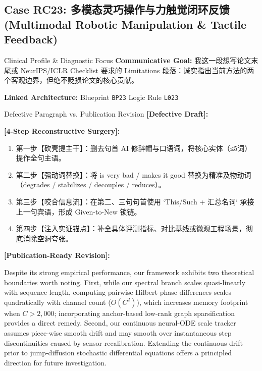 \subsection{Case RC23: 多模态灵巧操作与力触觉闭环反馈 (Multimodal Robotic Manipulation \& Tactile Feedback)}\label{case:RC23}
\begin{ConceptBox}{Clinical Profile \& Diagnostic Focus}
\textbf{Communicative Goal:} 我这一段想写论文末尾或 NeurIPS/ICLR Checklist 要求的 Limitations 段落：诚实指出当前方法的两个客观边界，但绝不贬损论文的核心贡献。\par
\textbf{Linked Architecture:} Blueprint \texttt{BP23} \enspace\textbar\enspace Logic Rule \texttt{L023}
\end{ConceptBox}
\begin{ExampleBox}{Defective Paragraph vs. Publication Revision}
\textbf{\color{TargetHighlight}[Defective Draft]:}\par
{}\par\vspace{6pt}
\textbf{\color{AcadForest}[4-Step Reconstructive Surgery]:}
\begin{enumerate}[label=\textbf{\color{AcadNavy}Step \arabic*:}, leftmargin=2em]
  \item 第一步【砍壳提主干】：删去句首 AI 修辞帽与口语词，将核心实体（≤5词）提作全句主语。
  \item 第二步【强动词替换】：将 is very bad / makes it good 替换为精准及物动词（degrades / stabilizes / decouples / reduces）。
  \item 第三步【咬合信息流】：在第二、三句句首使用 `This/Such + 汇总名词` 承接上一句宾语，形成 Given-to-New 锁链。
  \item 第四步【注入实证锚点】：补全具体评测指标、对比基线或微观工程场景，彻底消除空洞夸张。
\end{enumerate}\vspace{4pt}
\textbf{\color{AcadNavy}[Publication-Ready Revision]:}\par
Despite its strong empirical performance, our framework exhibits two theoretical boundaries worth noting. First, while our spectral branch scales quasi-linearly with sequence length, computing pairwise Hilbert phase differences scales quadratically with channel count ($O(C^2)$), which increases memory footprint when $C > 2,000$; incorporating anchor-based low-rank graph sparsification provides a direct remedy. Second, our continuous neural-ODE scale tracker assumes piece-wise smooth drift and may smooth over instantaneous step discontinuities caused by sensor recalibration. Extending the continuous drift prior to jump-diffusion stochastic differential equations offers a principled direction for future investigation.
\end{ExampleBox}
